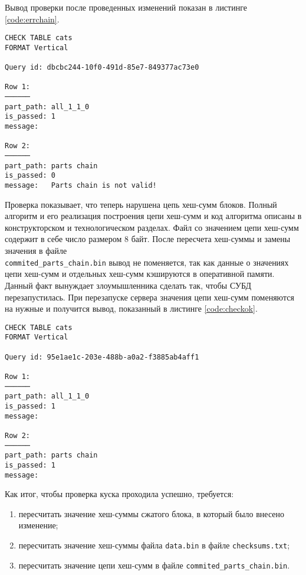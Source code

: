 Вывод проверки после проведенных изменений показан в листинге \ref{code:errchain}.

\begin{lstlisting}[label=code:errchain, caption={Результат проверки после исправления \texttt{checksums.txt}}]
CHECK TABLE cats
FORMAT Vertical

Query id: dbcbc244-10f0-491d-85e7-849377ac73e0

Row 1:
──────
part_path: all_1_1_0
is_passed: 1
message:

Row 2:
──────
part_path: parts chain
is_passed: 0
message:   Parts chain is not valid!
\end{lstlisting}

Проверка показывает, что теперь нарушена цепь хеш-сумм блоков. Полный алгоритм и его реализация построения цепи хеш-сумм и код алгоритма описаны в конструкторском и технологическом разделах. Файл со значением цепи хеш-сумм содержит в себе число размером 8 байт. После пересчета хеш-суммы и замены значения в файле \\ \texttt{commited\_parts\_chain.bin} вывод не поменяется, так как данные о значениях цепи хеш-сумм и отдельных хеш-сумм кэшируются в оперативной памяти. Данный факт вынуждает злоумышленника сделать так, чтобы СУБД перезапустилась. При перезапуске сервера значения цепи хеш-сумм поменяются на нужные и получится вывод, показанный в листинге \ref{code:checkok}.

\pagebreak

\begin{lstlisting}[label=code:checkok, caption={Результат проверки после исправления \texttt{commited\_parts\_chain.bin}.}]
CHECK TABLE cats
FORMAT Vertical

Query id: 95e1ae1c-203e-488b-a0a2-f3885ab4aff1

Row 1:
──────
part_path: all_1_1_0
is_passed: 1
message:

Row 2:
──────
part_path: parts chain
is_passed: 1
message:
\end{lstlisting}

Как итог, чтобы проверка куска проходила успешно, требуется:
\begin{enumerate}
    \item пересчитать значение хеш-суммы сжатого блока, в который было внесено изменение;
    \item пересчитать значение хеш-суммы файла \texttt{data.bin} в файле \texttt{checksums.txt};
    \item пересчитать значение цепи хеш-сумм в файле \texttt{commited\_parts\_chain.bin}.
\end{enumerate}

